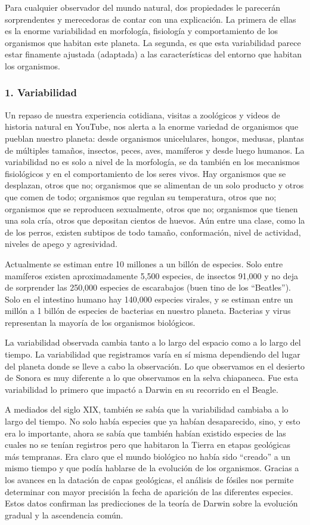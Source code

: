 \documentclass[
  letterpaper,
]{book}
\begin{document}
Para cualquier observador del mundo natural, dos propiedades le
parecerán sorprendentes y merecedoras de contar con una explicación. La
primera de ellas es la enorme variabilidad en morfología, fisiología y
comportamiento de los organismos que habitan este planeta. La segunda,
es que esta variabilidad parece estar finamente ajustada (adaptada) a
las características del entorno que habitan los organismos.

\subsubsection{1. Variabilidad}\label{variabilidad}

Un repaso de nuestra experiencia cotidiana, visitas a zoológicos y
videos de historia natural en YouTube, nos alerta a la enorme variedad
de organismos que pueblan nuestro planeta: desde organismos
unicelulares, hongos, medusas, plantas de múltiples tamaños, insectos,
peces, aves, mamíferos y desde luego humanos. La variabilidad no es solo
a nivel de la morfología, se da también en los mecanismos fisiológicos y
en el comportamiento de los seres vivos. Hay organismos que se
desplazan, otros que no; organismos que se alimentan de un solo producto
y otros que comen de todo; organismos que regulan su temperatura, otros
que no; organismos que se reproducen sexualmente, otros que no;
organismos que tienen una sola cría, otros que depositan cientos de
huevos. Aún entre una clase, como la de los perros, existen subtipos de
todo tamaño, conformación, nivel de actividad, niveles de apego y
agresividad.

Actualmente se estiman entre 10 millones a un billón de especies. Solo
entre mamíferos existen aproximadamente 5,500 especies, de insectos
91,000 y no deja de sorprender las 250,000 especies de escarabajos (buen
tino de los ``Beatles''). Solo en el intestino humano hay 140,000
especies virales, y se estiman entre un millón a 1 billón de especies de
bacterias en nuestro planeta. Bacterias y virus representan la mayoría
de los organismos biológicos.

La variabilidad observada cambia tanto a lo largo del espacio como a lo
largo del tiempo. La variabilidad que registramos varía en sí misma
dependiendo del lugar del planeta donde se lleve a cabo la observación.
Lo que observamos en el desierto de Sonora es muy diferente a lo que
observamos en la selva chiapaneca. Fue esta variabilidad lo primero que
impactó a Darwin en su recorrido en el Beagle.

A mediados del siglo XIX, también se sabía que la variabilidad cambiaba
a lo largo del tiempo. No solo había especies que ya habían
desaparecido, sino, y esto era lo importante, ahora se sabía que también
habían existido especies de las cuales no se tenían registros pero que
habitaron la Tierra en etapas geológicas más tempranas. Era claro que el
mundo biológico no había sido ``creado'' a un mismo tiempo y que podía
hablarse de la evolución de los organismos. Gracias a los avances en la
datación de capas geológicas, el análisis de fósiles nos permite
determinar con mayor precisión la fecha de aparición de las diferentes
especies. Estos datos confirman las predicciones de la teoría de Darwin
sobre la evolución gradual y la ascendencia común.
\end{document}
